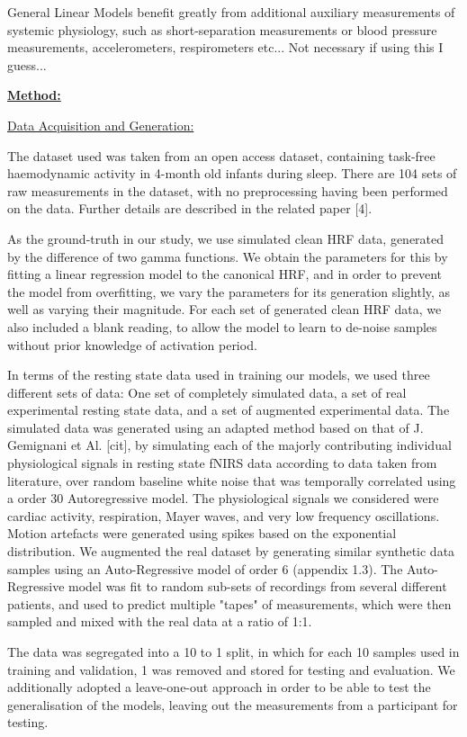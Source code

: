\documentclass[9pt]{article}
\begin{document}
General Linear Models benefit greatly from additional auxiliary measurements of systemic physiology, such as short-separation measurements or blood pressure measurements, accelerometers, respirometers etc... Not necessary if using this I guess...

\ul{\textbf{Method:}}
\vspace{-1mm}

\ul{Data Acquisition and Generation:}

The dataset used was taken from an open access dataset, containing task-free haemodynamic activity in 4-month old infants during sleep. There are 104 sets of raw measurements in the dataset, with no preprocessing having been performed on the data. Further details are described in the related paper [4].

As the ground-truth in our study, we use simulated clean HRF data, generated by the difference of two gamma functions. We obtain the parameters for this by fitting a linear regression model to the canonical HRF, and in order to prevent the model from overfitting, we vary the parameters for its generation slightly, as well as varying their magnitude. For each set of generated clean HRF data, we also included a blank reading, to allow the model to learn to de-noise samples without prior knowledge of activation period.

In terms of the resting state data used in training our models, we used three different sets of data: One set of completely simulated data, a set of real experimental resting state data, and a set of augmented experimental data. The simulated data was generated using an adapted method based on that of J. Gemignani et Al. [cit], by simulating each of the majorly contributing individual physiological signals in resting state fNIRS data according to data taken from literature, over random baseline white noise that was temporally correlated using a order 30 Autoregressive model. The physiological signals we considered were cardiac activity, respiration, Mayer waves, and very low frequency oscillations. Motion artefacts were generated using spikes based on the exponential distribution. We augmented the real dataset by generating similar synthetic data samples using an Auto-Regressive model of order 6 (appendix 1.3). The Auto-Regressive model was fit to random sub-sets of recordings from several different patients, and used to predict multiple "tapes" of measurements, which were then sampled and mixed with the real data at a ratio of 1:1.

The data was segregated into a 10 to 1 split, in which for each 10 samples used in training and validation, 1 was removed and stored for testing and evaluation. We additionally adopted a leave-one-out approach in order to be able to test the generalisation of the models, leaving out the measurements from a participant for testing.
\end{document}
